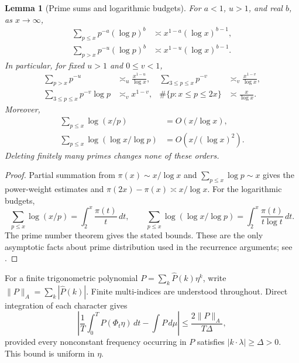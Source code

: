 \documentclass[11pt,letterpaper]{article}
\newtheorem{lemma}[theorem]{Lemma}
\theoremstyle{definition}
\theoremstyle{remark}
\newcommand{\1}{\mathbf 1}
\begin{document}
\begin{lemma}[Prime sums and logarithmic budgets]\label{p01:lem:primes}
For $a<1$, $u>1$, and real $b$, as $x\to\infty$,
\begin{align}
 \sum_{p\le x}p^{-a}(\log p)^b
 &\asymp x^{1-a}(\log x)^{b-1},\label{p02:eq:prime-sum}\\
 \sum_{p>x}p^{-u}(\log p)^b
 &\asymp x^{1-u}(\log x)^{b-1}.\label{p02:eq:prime-tail}
\end{align}
In particular, for fixed $u>1$ and $0\le v<1$,
\begin{align}
 \sum_{p>x}p^{-u}&\asymp_u\frac{x^{1-u}}{\log x},
 &\sum_{3\le p\le x}p^{-v}&\asymp_v\frac{x^{1-v}}{\log x},
 \label{p01:eq:primesums}\\
 \sum_{3\le p\le x}p^{-v}\log p&\asymp_v x^{1-v},
 &\#\{p:x\le p\le2x\}&\asymp\frac{x}{\log x}.
 \label{p01:eq:primeblocks}
\end{align}
Moreover,
\begin{align}
 \sum_{p\le x}\log(x/p)&=O(x/\log x),
 \label{p02:eq:log-budget}\\
 \sum_{p\le x}\log(\log x/\log p)&=O(x/(\log x)^2).
 \label{p02:eq:loglog-budget}
\end{align}
Deleting finitely many primes changes none of these orders.
\end{lemma}
\begin{proof}
Partial summation from $\pi(x)\sim x/\log x$ and
$\sum_{p\le x}\log p\sim x$ gives the power-weight estimates and
$\pi(2x)-\pi(x)\asymp x/\log x$. For the logarithmic budgets,
\[
 \sum_{p\le x}\log(x/p)=\int_2^x\frac{\pi(t)}{t}\,dt,
 \qquad
 \sum_{p\le x}\log(\log x/\log p)
 =\int_2^x\frac{\pi(t)}{t\log t}\,dt.
\]
The prime number theorem gives the stated bounds. These are the only
asymptotic facts about prime distribution used in the recurrence
arguments; see \cite{MontgomeryVaughan}.
\end{proof}

For a finite trigonometric polynomial $P=\sum_k\widehat P(k)\eta^k$,
write $\|P\|_A=\sum_k|\widehat P(k)|$. Finite multi-indices are understood
throughout. Direct integration of each character gives
\begin{equation}\label{p02:eq:fourier-average}
 \left|\frac1T\int_0^T P(\Phi_t\eta)\,dt-\int P\,d\mu\right|
 \le\frac{2\|P\|_A}{T\Delta},
\end{equation}
provided every nonconstant frequency occurring in $P$ satisfies
$|k\cdot\lambda|\ge\Delta>0$. This bound is uniform in $\eta$.
\end{document}
